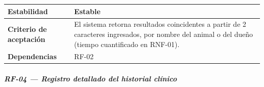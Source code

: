 \documentclass[
]{article}
\begin{document}
{\begin{longtable}[]{|
  >{\raggedright\arraybackslash}p{}|
  >{\raggedright\arraybackslash}p{}|}
\hline
\textbf{Estabilidad} & \begin{minipage}[t]{\linewidth}\raggedright
Estable
\end{minipage} \\
\hline
\textbf{Criterio de aceptación} &
\begin{minipage}[t]{\linewidth}\raggedright
El sistema retorna resultados coincidentes a partir de 2 caracteres ingresados, por nombre del animal o del dueño (tiempo cuantificado en RNF-01).
\end{minipage} \\
\hline
\textbf{Dependencias} & \begin{minipage}[t]{\linewidth}\raggedright
RF-02
\end{minipage} \\
\hline
\end{longtable}
}

\subparagraph{RF-04 --- Registro detallado del historial clínico}\label{rf-04-registro-detallado-del-historial-cl-nico}
\end{document}
